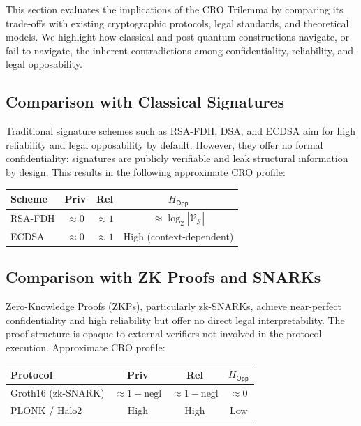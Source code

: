 \documentclass[preprint,12pt]{elsarticle}
\newcommand{\negl}{\mathrm{negl}}
\begin{document}
        This section evaluates the implications of the CRO Trilemma by comparing its trade-offs with existing cryptographic protocols, legal standards, and theoretical models. We highlight how classical and post-quantum constructions navigate, or fail to navigate, the inherent contradictions among confidentiality, reliability, and legal opposability.

        \subsection{Comparison with Classical Signatures}\label{subsec:discussion_classical_signatures}

            Traditional signature schemes such as RSA-FDH, DSA, and ECDSA aim for high reliability and legal opposability by default. However, they offer no formal confidentiality: signatures are publicly verifiable and leak structural information by design. This results in the following approximate CRO profile:

            \begin{center}
                \begin{tabular}{lccc}
                    \toprule
                        \textbf{Scheme} & \textbf{Priv} & \textbf{Rel} & \textbf{$H_{\mathsf{Opp}}$} \\
                        \midrule
                        RSA-FDH & $\approx 0$ & $\approx 1$ & $\approx \log_2 |\mathcal{V}_{\mathcal{J}}|$ \\
                        ECDSA & $\approx 0$ & $\approx 1$ & High (context-dependent) \\
                    \bottomrule
                \end{tabular}
            \end{center}

        \subsection{Comparison with ZK Proofs and SNARKs}\label{subsec:discussion_zk_snarks}

            Zero-Knowledge Proofs (ZKPs), particularly zk-SNARKs, achieve near-perfect confidentiality and high reliability but offer no direct legal interpretability. The proof structure is opaque to external verifiers not involved in the protocol execution. Approximate CRO profile:

            \begin{center}
                \begin{tabular}{lccc}
                    \toprule
                    \textbf{Protocol} & \textbf{Priv} & \textbf{Rel} & \textbf{$H_{\mathsf{Opp}}$} \\
                    \midrule
                        Groth16 (zk-SNARK) & $\approx 1 - \negl$ & $\approx 1 - \negl$ & $\approx 0$ \\
                        PLONK / Halo2 & High & High & Low \\
                    \bottomrule
                \end{tabular}
            \end{center}
\end{document}
